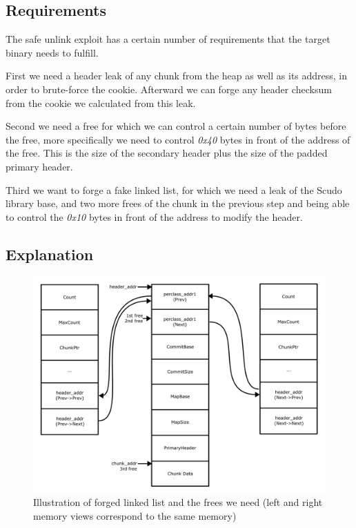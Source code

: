\documentclass[a4paper,11pt,oneside]{report}
\begin{document}
\subsection{Requirements}

The safe unlink exploit has a certain number of requirements that the target binary needs
to fulfill.

First we need a header leak of any chunk from the heap as well as its address, in
order to brute-force the cookie. Afterward we can forge any header checksum from the
cookie we calculated from this leak.

Second we need a free for which we can control a certain number of bytes before the free,
more specifically we need to control \emph{0x40} bytes in front of the address of the
free. This is the size of the secondary header plus the size of the padded primary header.

Third we want to forge a fake linked list, for which we need a leak of the Scudo library
base, and two more frees of the chunk in the previous step and
being able to control the \emph{0x10} bytes in front of the address to modify the
header.

\subsection{Explanation}

\begin{figure}[h!]
  \centering
  \includegraphics[width=\linewidth]{figures/SafeUnlinkMemoryFrees.png}
  \caption{Illustration of forged linked list and the frees we
    need (left and right memory views correspond to the same memory)}\label{fig:SafeUnlinkMemoryFrees}
\end{figure}
\end{document}
